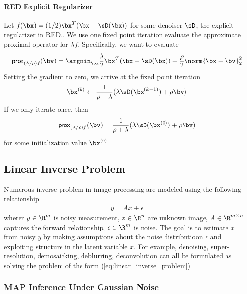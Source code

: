 \documentclass[../writeup.tex]{subfiles}
\begin{document}
\paragraph{RED Explicit Regularizer}

Let $f(\bx) = (1/2)\bx^T(\bx-\sD(\bx))$ for some denoiser $\sD$, the explicit regularizer in RED.\cite{romanoLittleEngineThat2016}. We use one fixed point iteration evaluate the approximate proximal operator for $\lambda f$. Specifically, we want to evaluate 
\begin{align}
    \prox_{(\lambda/\rho)f} (\bv)
        = \argmin_{\bx} \frac{\lambda}{2}\bx^T(\bx-\sD(\bx)) + \frac{\rho}{2} \norm{\bx-\bv}_2^2
\end{align}
Setting the gradient to zero, we arrive at the fixed point iteration
\begin{align}
    \bx^{(k)} \leftarrow \frac{1}{\rho+\lambda}(
        \lambda \sD(\bx^{(k-1)}) + \rho \bv
    )
    \label{eq:red_explicit_regularizer_update_fixed_point}
\end{align}
If we only iterate once, then 
\begin{align}
    \prox_{(\lambda/\rho)f} (\bv)
        = \frac{1}{\rho+\lambda}( \lambda \sD(\bx^{(0)}) + \rho \bv )
    \label{eq:red_explicit_regularizer_update_fixed_point_once}
\end{align}
for some initialization value $\bx^{(0)}$



\subsection{Linear Inverse Problem}

Numerous inverse problem in image processing are modeled using the following relationship
\begin{align}
    y = Ax + \epsilon   
    \label{eq:linear_inverse_problem}
\end{align}
wherer $y\in\R^m$ is noisy measurement, $x\in\R^n$ are unknown image, $A \in \R^{m\times n}$ captures the forward relationship, $\epsilon\in\R^m$ is noise. The goal is to estimate $x$ from noisy $y$ by making assumptions about the noise distributioon $\epsilon$ and exploiting structure in the latent variable $x$. For example, denoising, super-resolution, demosaicking, deblurring, deconvolution can all be formulated as solving the problem of the form (\ref{eq:linear_inverse_problem})


\subsubsection{MAP Inference Under Gaussian Noise}
\end{document}
